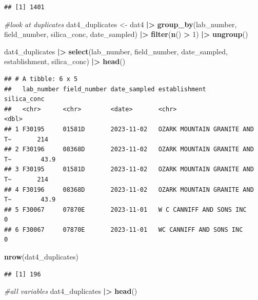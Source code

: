 \documentclass[
]{article}
\newenvironment{Shaded}{\begin{snugshade}}{\end{snugshade}}
\newcommand{\CommentTok}[1]{\textcolor[rgb]{0.56,0.35,0.01}{\textit{#1}}}
\newcommand{\DecValTok}[1]{\textcolor[rgb]{0.00,0.00,0.81}{#1}}
\newcommand{\FunctionTok}[1]{\textcolor[rgb]{0.13,0.29,0.53}{\textbf{#1}}}
\newcommand{\NormalTok}[1]{#1}
\newcommand{\OtherTok}[1]{\textcolor[rgb]{0.56,0.35,0.01}{#1}}
\newcommand{\SpecialCharTok}[1]{\textcolor[rgb]{0.81,0.36,0.00}{\textbf{#1}}}
\begin{document}
\begin{verbatim}
## [1] 1401
\end{verbatim}

\begin{Shaded}
\begin{Highlighting}[]
\CommentTok{\#look at duplicates }
\NormalTok{dat4\_duplicates }\OtherTok{\textless{}{-}}\NormalTok{ dat4 }\SpecialCharTok{|\textgreater{}}
  \FunctionTok{group\_by}\NormalTok{(lab\_number, field\_number, silica\_conc, date\_sampled) }\SpecialCharTok{|\textgreater{}}
  \FunctionTok{filter}\NormalTok{(}\FunctionTok{n}\NormalTok{() }\SpecialCharTok{\textgreater{}} \DecValTok{1}\NormalTok{) }\SpecialCharTok{|\textgreater{}}
  \FunctionTok{ungroup}\NormalTok{() }

\NormalTok{dat4\_duplicates }\SpecialCharTok{|\textgreater{}}  
  \FunctionTok{select}\NormalTok{(lab\_number, field\_number, date\_sampled, establishment, silica\_conc) }\SpecialCharTok{|\textgreater{}} 
  \FunctionTok{head}\NormalTok{()}
\end{Highlighting}
\end{Shaded}

\begin{verbatim}
## # A tibble: 6 x 5
##   lab_number field_number date_sampled establishment                 silica_conc
##   <chr>      <chr>        <date>       <chr>                               <dbl>
## 1 F30195     01581D       2023-11-02   OZARK MOUNTAIN GRANITE AND T~       214  
## 2 F30196     08368D       2023-11-02   OZARK MOUNTAIN GRANITE AND T~        43.9
## 3 F30195     01581D       2023-11-02   OZARK MOUNTAIN GRANITE AND T~       214  
## 4 F30196     08368D       2023-11-02   OZARK MOUNTAIN GRANITE AND T~        43.9
## 5 F30067     07870E       2023-11-01   W C CANNIFF AND SONS INC              0  
## 6 F30067     07870E       2023-11-01   WC CANNIFF AND SONS INC               0
\end{verbatim}

\begin{Shaded}
\begin{Highlighting}[]
\FunctionTok{nrow}\NormalTok{(dat4\_duplicates)}
\end{Highlighting}
\end{Shaded}

\begin{verbatim}
## [1] 196
\end{verbatim}

\begin{Shaded}
\begin{Highlighting}[]
\CommentTok{\#all variables }
\NormalTok{dat4\_duplicates }\SpecialCharTok{|\textgreater{}}   
  \FunctionTok{head}\NormalTok{()}
\end{Highlighting}
\end{Shaded}
\end{document}
